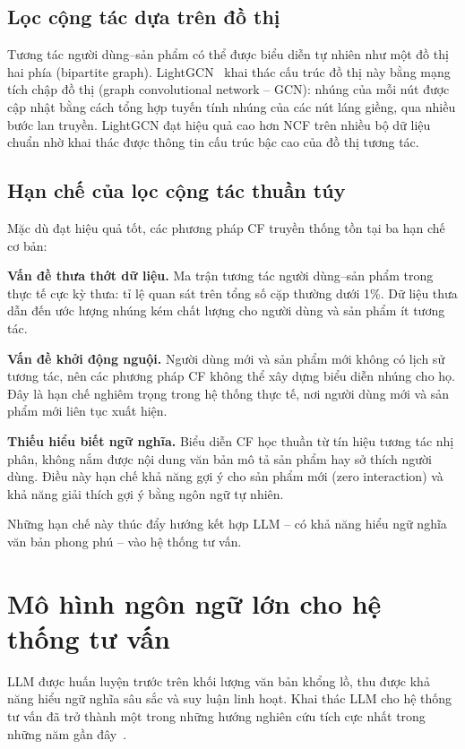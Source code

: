 \subsection{Lọc cộng tác dựa trên đồ thị}
\label{ssec:lightgcn}

Tương tác người dùng--sản phẩm có thể được biểu diễn tự nhiên như một đồ thị hai phía
(bipartite graph). LightGCN~\cite{lightgcn2020} khai thác cấu trúc đồ thị này bằng mạng
tích chập đồ thị (graph convolutional network -- GCN): nhúng của mỗi nút được cập nhật
bằng cách tổng hợp tuyến tính nhúng của các nút láng giềng, qua nhiều bước lan truyền.
LightGCN đạt hiệu quả cao hơn NCF trên nhiều bộ dữ liệu chuẩn nhờ khai thác được thông
tin cấu trúc bậc cao của đồ thị tương tác.

\subsection{Hạn chế của lọc cộng tác thuần túy}
\label{ssec:han-che-cf}

Mặc dù đạt hiệu quả tốt, các phương pháp CF truyền thống tồn tại ba hạn chế cơ bản:

\textbf{Vấn đề thưa thớt dữ liệu.} Ma trận tương tác người dùng--sản phẩm trong thực
tế cực kỳ thưa: tỉ lệ quan sát trên tổng số cặp thường dưới 1\%. Dữ liệu thưa dẫn đến
ước lượng nhúng kém chất lượng cho người dùng và sản phẩm ít tương tác.

\textbf{Vấn đề khởi động nguội.} Người dùng mới và sản phẩm mới không có lịch sử tương
tác, nên các phương pháp CF không thể xây dựng biểu diễn nhúng cho họ. Đây là hạn chế
nghiêm trọng trong hệ thống thực tế, nơi người dùng mới và sản phẩm mới liên tục xuất
hiện.

\textbf{Thiếu hiểu biết ngữ nghĩa.} Biểu diễn CF học thuần từ tín hiệu tương tác nhị
phân, không nắm được nội dung văn bản mô tả sản phẩm hay sở thích người dùng. Điều này
hạn chế khả năng gợi ý cho sản phẩm mới (zero interaction) và khả năng giải thích gợi ý
bằng ngôn ngữ tự nhiên.

Những hạn chế này thúc đẩy hướng kết hợp LLM -- có khả năng hiểu ngữ nghĩa văn bản
phong phú -- vào hệ thống tư vấn.

\section{Mô hình ngôn ngữ lớn cho hệ thống tư vấn}
\label{sec:llm-rec}

LLM được huấn luyện trước trên khối lượng văn bản khổng lồ, thu được khả năng hiểu ngữ
nghĩa sâu sắc và suy luận linh hoạt. Khai thác LLM cho hệ thống tư vấn đã trở thành một
trong những hướng nghiên cứu tích cực nhất trong những năm gần đây~\cite{llmrec2023}.

